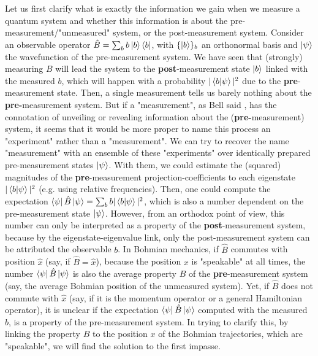 \documentclass[11pt, a4paper]{article} %
\begin{document}
Let us first clarify what is exactly the information we gain when we measure a quantum system and whether this information is about the pre-measurement/"unmeasured" system, or the post-measurement system. Consider an observable operator $\hat{B}=\sum_b b\ket{b}\bra{b}$, with $\{\ket{b}\}_b$ an orthonormal basis and $\ket{\psi}$ the wavefunction of the pre-measurement system. We have seen that (strongly) measuring $B$ will lead the system to the {\bf post}-measurement state $\ket{b}$ linked with the measured $b$, which will happen with a probability $|\bra{b}\ket{\psi}|^2$ due to the {\bf pre}-measurement state. Then, a single measurement tells us barely nothing about the {\bf pre-}measurement system. But if a "measurement", as Bell said \cite{Bell}, has the connotation of unveiling or revealing information about the ({\bf pre-}measurement) system, it seems that it would be more proper to name this process an "experiment" rather than a "measurement". We can try to recover the name "measurement" with an ensemble of these "experiments" over identically prepared pre-measurement states $\ket{\psi}$. With them, we could estimate the (squared) magnitudes of the {\bf pre}-measurement projection-coefficients to each eigenstate $|\bra{b}\ket{\psi}|^2$ (e.g. using relative frequencies). Then, one could compute the expectation $\bra{\psi} \hat B \ket{\psi}=\sum_b b |\bra{b}\ket{\psi}|^2$, which is also a number dependent on the pre-measurement state $\ket{\psi}$. However, from an orthodox point of view, this number can only be interpreted as a property of the {\bf post}-measurement system, because by the eigenstate-eigenvalue link, only the post-measurement system can be attributed the observable $b$. In Bohmian mechanics, if $\hat{B}$ commutes with position $\hat{x}$ (say, if $\hat{B}=\hat{x}$), because the position $x$ is "speakable" at all times, the number $\bra{\psi} \hat B \ket{\psi}$ is also the average property $B$ of the {\bf pre}-measurement system (say, the average Bohmian position of the unmeasured system). Yet, if $\hat{B}$ does not commute with $\hat{x}$ (say, if it is the momentum operator or a general Hamiltonian operator), it is unclear if the expectation $\bra{\psi} \hat B \ket{\psi}$ computed with the measured $b$, is a property of the pre-measurement system. In trying to clarify this, by linking the property $B$ to the position $x$ of the Bohmian trajectories, which are "speakable", we will find the solution to the first impasse.
\end{document}
